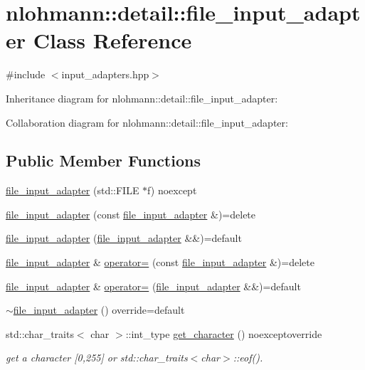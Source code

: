 \hypertarget{classnlohmann_1_1detail_1_1file__input__adapter}{}\section{nlohmann\+:\+:detail\+:\+:file\+\_\+input\+\_\+adapter Class Reference}
\label{classnlohmann_1_1detail_1_1file__input__adapter}


{\ttfamily \#include $<$input\+\_\+adapters.\+hpp$>$}



Inheritance diagram for nlohmann\+:\+:detail\+:\+:file\+\_\+input\+\_\+adapter\+:


Collaboration diagram for nlohmann\+:\+:detail\+:\+:file\+\_\+input\+\_\+adapter\+:
\subsection*{Public Member Functions}
\begin{DoxyCompactItemize}
\item 
\hyperlink{classnlohmann_1_1detail_1_1file__input__adapter_aeade050f2793280503be93feff2ece5b}{file\+\_\+input\+\_\+adapter} (std\+::\+F\+I\+LE $\ast$f) noexcept
\item 
\hyperlink{classnlohmann_1_1detail_1_1file__input__adapter_a308099b496a0cba2123a06fe99a95d02}{file\+\_\+input\+\_\+adapter} (const \hyperlink{classnlohmann_1_1detail_1_1file__input__adapter}{file\+\_\+input\+\_\+adapter} \&)=delete
\item 
\hyperlink{classnlohmann_1_1detail_1_1file__input__adapter_a10b4dec4e8751a4f8a110fa917f0d5a8}{file\+\_\+input\+\_\+adapter} (\hyperlink{classnlohmann_1_1detail_1_1file__input__adapter}{file\+\_\+input\+\_\+adapter} \&\&)=default
\item 
\hyperlink{classnlohmann_1_1detail_1_1file__input__adapter}{file\+\_\+input\+\_\+adapter} \& \hyperlink{classnlohmann_1_1detail_1_1file__input__adapter_ad59bbc7e3f23dd74475c5cb818784e42}{operator=} (const \hyperlink{classnlohmann_1_1detail_1_1file__input__adapter}{file\+\_\+input\+\_\+adapter} \&)=delete
\item 
\hyperlink{classnlohmann_1_1detail_1_1file__input__adapter}{file\+\_\+input\+\_\+adapter} \& \hyperlink{classnlohmann_1_1detail_1_1file__input__adapter_a95adaec9a8c583a46083c4c493981e77}{operator=} (\hyperlink{classnlohmann_1_1detail_1_1file__input__adapter}{file\+\_\+input\+\_\+adapter} \&\&)=default
\item 
\hyperlink{classnlohmann_1_1detail_1_1file__input__adapter_af96552e4560be08b201e62a36e6b6189}{$\sim$file\+\_\+input\+\_\+adapter} () override=default
\item 
std\+::char\+\_\+traits$<$ char $>$\+::int\+\_\+type \hyperlink{classnlohmann_1_1detail_1_1file__input__adapter_a9faaa1d99d08f50cacc57d1904d7cce1}{get\+\_\+character} () noexceptoverride
\begin{DoxyCompactList}\small\item\em get a character \mbox{[}0,255\mbox{]} or std\+::char\+\_\+traits$<$char$>$\+::eof(). \end{DoxyCompactList}\end{DoxyCompactItemize}
